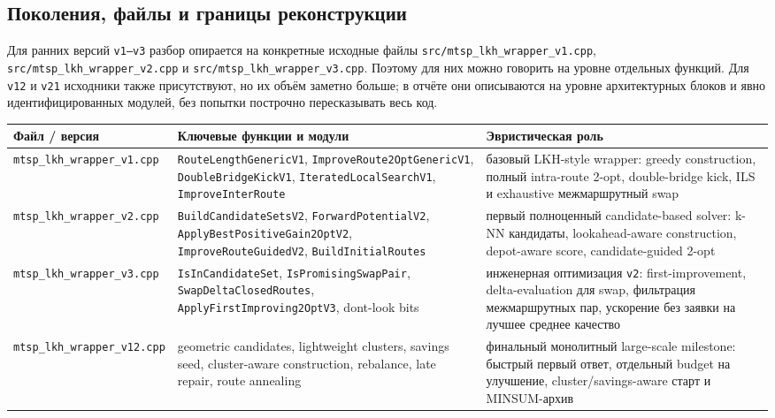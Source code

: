 \documentclass[14pt,a4paper]{extarticle}
\begin{document}
\subsection{Поколения, файлы и границы реконструкции}

Для ранних версий \texttt{v1--v3} разбор опирается на конкретные исходные файлы \texttt{src/mtsp\_lkh\_wrapper\_v1.cpp}, \texttt{src/mtsp\_lkh\_wrapper\_v2.cpp} и \texttt{src/mtsp\_lkh\_wrapper\_v3.cpp}. Поэтому для них можно говорить на уровне отдельных функций. Для \texttt{v12} и \texttt{v21} исходники также присутствуют, но их объём заметно больше; в отчёте они описываются на уровне архитектурных блоков и явно идентифицированных модулей, без попытки построчно пересказывать весь код.

{\scriptsize\setlength{\tabcolsep}{2pt}
\begin{longtable}{>{\raggedright\arraybackslash}p{}>{\raggedright\arraybackslash}p{}>{\raggedright\arraybackslash}p{}}
\toprule
\textbf{Файл / версия} & \textbf{Ключевые функции и модули} & \textbf{Эвристическая роль}\\
\midrule
\endhead
\texttt{mtsp\_lkh\_wrapper\_v1.cpp} & \texttt{RouteLengthGenericV1}, \texttt{ImproveRoute2OptGenericV1}, \texttt{DoubleBridgeKickV1}, \texttt{IteratedLocalSearchV1}, \texttt{ImproveInterRoute} & базовый LKH-style wrapper: greedy construction, полный intra-route 2-opt, double-bridge kick, ILS и exhaustive межмаршрутный swap\\
\texttt{mtsp\_lkh\_wrapper\_v2.cpp} & \texttt{BuildCandidateSetsV2}, \texttt{ForwardPotentialV2}, \texttt{ApplyBestPositiveGain2OptV2}, \texttt{ImproveRouteGuidedV2}, \texttt{BuildInitialRoutes} & первый полноценный candidate-based solver: k-NN кандидаты, lookahead-aware construction, depot-aware score, candidate-guided 2-opt\\
\texttt{mtsp\_lkh\_wrapper\_v3.cpp} & \texttt{IsInCandidateSet}, \texttt{IsPromisingSwapPair}, \texttt{SwapDeltaClosedRoutes}, \texttt{ApplyFirstImproving2OptV3}, dont-look bits & инженерная оптимизация \texttt{v2}: first-improvement, delta-evaluation для swap, фильтрация межмаршрутных пар, ускорение без заявки на лучшее среднее качество\\
\texttt{mtsp\_lkh\_wrapper\_v12.cpp} & geometric candidates, lightweight clusters, savings seed, cluster-aware construction, rebalance, late repair, route annealing & финальный монолитный large-scale milestone: быстрый первый ответ, отдельный budget на улучшение, cluster/savings-aware старт и MINSUM-архив\\

\end{longtable}}
\end{document}
